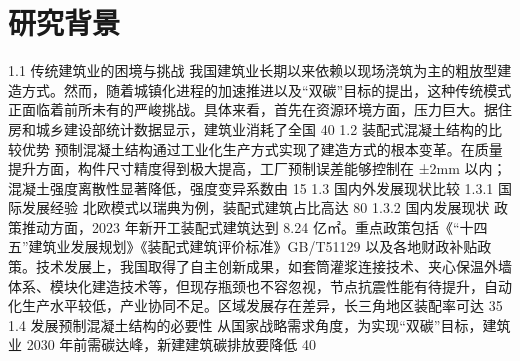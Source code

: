 \chapter{研究背景}
\label{cha:background}
1.1 传统建筑业的困境与挑战
我国建筑业长期以来依赖以现场浇筑为主的粗放型建造方式。然而，随着城镇化进程的加速推进以及“双碳”目标的提出，这种传统模式正面临着前所未有的严峻挑战。具体来看，首先在资源环境方面，压力巨大。据住房和城乡建设部统计数据显示，建筑业消耗了全国 40%
1.2 装配式混凝土结构的比较优势
预制混凝土结构通过工业化生产方式实现了建造方式的根本变革。在质量提升方面，构件尺寸精度得到极大提高，工厂预制误差能够控制在 ±2mm 以内；混凝土强度离散性显著降低，强度变异系数由 15%
1.3 国内外发展现状比较
1.3.1 国际发展经验
北欧模式以瑞典为例，装配式建筑占比高达 80%
1.3.2 国内发展现状
政策推动方面，2023 年新开工装配式建筑达到 8.24 亿㎡。重点政策包括《“十四五”建筑业发展规划》《装配式建筑评价标准》GB/T51129 以及各地财政补贴政策。技术发展上，我国取得了自主创新成果，如套筒灌浆连接技术、夹心保温外墙体系、模块化建造技术等，但现存瓶颈也不容忽视，节点抗震性能有待提升，自动化生产水平较低，产业协同不足。区域发展存在差异，长三角地区装配率可达 35%
1.4 发展预制混凝土结构的必要性
从国家战略需求角度，为实现“双碳”目标，建筑业 2030 年前需碳达峰，新建建筑碳排放要降低 40%